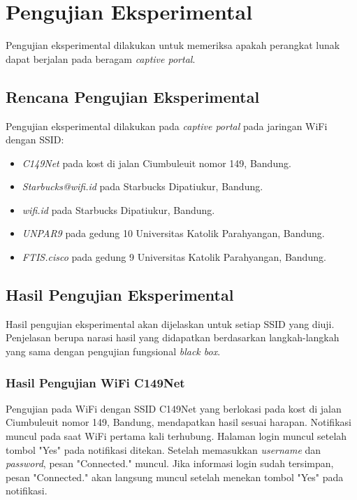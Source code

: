 \section{Pengujian Eksperimental}
\label{sec:pengujian_eksperimental}

Pengujian eksperimental dilakukan untuk memeriksa apakah perangkat lunak dapat berjalan pada beragam \textit{captive portal}.

\subsection{Rencana Pengujian Eksperimental}
\label{subsec:rencana_pengujian_eksperimental}

Pengujian eksperimental dilakukan pada \textit{captive portal} pada jaringan WiFi dengan SSID:

\begin{itemize}
    \item{\textit{C149Net} pada kost di jalan Ciumbuleuit nomor 149, Bandung.}
    \item{\textit{Starbucks@wifi.id} pada Starbucks Dipatiukur, Bandung.}
    \item{\textit{wifi.id} pada Starbucks Dipatiukur, Bandung.}
    \item{\textit{UNPAR9} pada gedung 10 Universitas Katolik Parahyangan, Bandung.}
    \item{\textit{FTIS.cisco} pada gedung 9 Universitas Katolik Parahyangan, Bandung.}
\end{itemize}

\subsection{Hasil Pengujian Eksperimental}
\label{subsec:hasil_pengujian_eksperimental}

Hasil pengujian eksperimental akan dijelaskan untuk setiap SSID yang diuji. Penjelasan berupa narasi hasil yang didapatkan berdasarkan langkah-langkah yang sama dengan pengujian fungsional \textit{black box}.

\subsubsection{Hasil Pengujian WiFi C149Net}
\label{subsubsec:C149Net}

Pengujian pada WiFi dengan SSID C149Net yang berlokasi pada kost di jalan Ciumbuleuit nomor 149, Bandung, mendapatkan hasil sesuai harapan. Notifikasi muncul pada saat WiFi pertama kali terhubung. Halaman login muncul setelah tombol "Yes" pada notifikasi ditekan. Setelah memasukkan \textit{username} dan \textit{password}, pesan "Connected." muncul. Jika informasi login sudah tersimpan, pesan "Connected." akan langsung muncul setelah menekan tombol "Yes" pada notifikasi.


